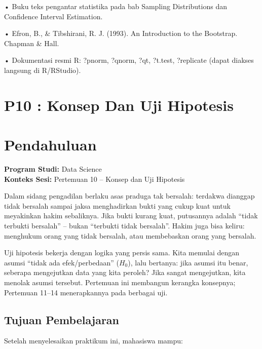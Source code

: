 \documentclass[
  indonesian,
  letterpaper,
]{book}
\begin{document}
• Buku teks pengantar statistika pada bab Sampling Distributions dan
Confidence Interval Estimation.

• Efron, B., \& Tibshirani, R. J. (1993). An Introduction to the
Bootstrap. Chapman \& Hall.

• Dokumentasi resmi R: ?pnorm, ?qnorm, ?qt, ?t.test, ?replicate (dapat
diakses langsung di R/RStudio).


\chapter{P10 : Konsep Dan Uji
Hipotesis}\label{p10-konsep-dan-uji-hipotesis}


\chapter{Pendahuluan}\label{pendahuluan}

\textbf{Program Studi:} Data Science\\
\textbf{Konteks Sesi:} Pertemuan 10 -- Konsep dan Uji Hipotesis

Dalam sidang pengadilan berlaku asas praduga tak bersalah: terdakwa
dianggap tidak bersalah sampai jaksa menghadirkan bukti yang cukup kuat
untuk meyakinkan hakim sebaliknya. Jika bukti kurang kuat, putusannya
adalah ``tidak terbukti bersalah'' -- bukan ``terbukti tidak bersalah''.
Hakim juga bisa keliru: menghukum orang yang tidak bersalah, atau
membebaskan orang yang bersalah.

Uji hipotesis bekerja dengan logika yang persis sama. Kita memulai
dengan asumsi ``tidak ada efek/perbedaan'' (\(H_0\)), lalu bertanya:
jika asumsi itu benar, seberapa mengejutkan data yang kita peroleh? Jika
sangat mengejutkan, kita menolak asumsi tersebut. Pertemuan ini
membangun kerangka konsepnya; Pertemuan 11--14 menerapkannya pada
berbagai uji.

\section{Tujuan Pembelajaran}\label{tujuan-pembelajaran}

Setelah menyelesaikan praktikum ini, mahasiswa mampu:
\end{document}
